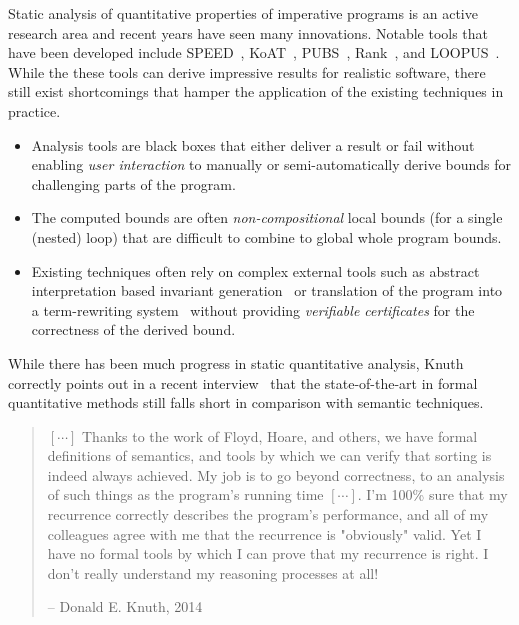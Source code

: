 \documentclass[nocopyrightspace,preprint]{sigplanconf}
\begin{document}
Static analysis of quantitative properties of imperative programs is
an active research area and recent years have seen many innovations.
Notable tools that have been developed include
SPEED~\cite{GulwaniMC09}, KoAT~\cite{BrockschmidtEFFG14},
PUBS~\cite{AlbertAGPZ12}, Rank~\cite{AliasDFG10}, and LOOPUS~\cite{SinnZV14}.
%
While the these tools can derive impressive results for realistic
software, there still exist shortcomings that hamper the application
of the existing techniques in practice.
\begin{itemize}
\item Analysis tools are black boxes that either deliver a result or fail
  without enabling \emph{user interaction} to manually or
  semi-automatically derive bounds for challenging parts of the
  program.
\item The computed bounds are often \emph{non-compositional} local
  bounds (for a single (nested) loop) that are difficult to combine to
  global whole program bounds.
\item Existing techniques often rely on complex external tools such as
  abstract interpretation based invariant
  generation~\cite{GulwaniMC09} or translation of the program into a
  term-rewriting system~\cite{BrockschmidtEFFG14, SinnZV14} without
  providing \emph{verifiable certificates} for the correctness of the
  derived bound.
\end{itemize}
%
While there has been much progress in static quantitative analysis,
Knuth correctly points out in a recent interview~\cite{KnuthInter}
that the state-of-the-art in formal quantitative methods still falls
short in comparison with semantic techniques.
%
\begin{quote}
  $[\cdots]$ Thanks to the work of Floyd, Hoare, and others,
  we have formal definitions of semantics, and tools by which we can
  verify that sorting is indeed always achieved. My job is to go
  beyond correctness, to an analysis of such things as the program's
  running time $[\cdots]$. I'm 100\% sure that my recurrence correctly
  describes the program's performance, and all of my colleagues agree
  with me that the recurrence is "obviously" valid. Yet I have no
  formal tools by which I can prove that my recurrence is right. I
  don't really understand my reasoning processes at all!
  \vspace{-3ex}
  \begin{flushright}
    -- Donald E. Knuth, 2014
  \end{flushright}
\end{quote}
\end{document}
